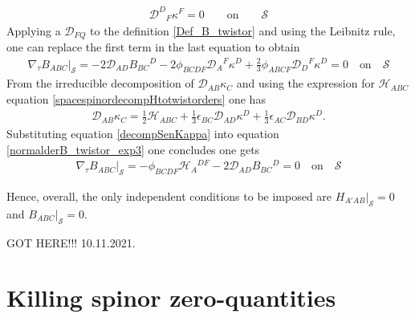 \documentclass[10pt,a4paper]{article}
\theoremstyle{plain}
\begin{document}
{\begin{align}
\mathcal{D} ^{D}{}_{F}\kappa ^{F} = 0 \qquad \text{on} \qquad
\mathcal{S}
\end{align}
Applying a $\mathcal{D}_{FQ}$ to the definition \eqref{Def_B_twistor}
and using the Leibnitz rule, one can replace the first term in the
last equation to obtain
\begin{align}\label{normalderB_twistor_exp3}
\nabla_{\tau}B_{ABC}|_{\mathcal{S}}= -2 \mathcal{D} _{AD}B_{BC}{}^{D} -2 \phi _{BCDF} \mathcal{D}
_{A}{}^{F}\kappa ^{D} +\tfrac{2}{3} \phi _{ABCF} \mathcal{D} _{D}{}^{F}\kappa ^{D}
= 0 \quad \text{on} \quad \mathcal{S}
\end{align}
From the irreducible decomposition of $\mathcal{D} _{AB}\kappa _{C}$
and using the expression for $\mathcal{H}_{ABC}$ equation
\eqref{spacespinordecompHtotwistorders} one has
\begin{align}\label{decompSenKappa}
\mathcal{D} _{AB}\kappa _{C} = \tfrac{1}{2} \mathcal{H} _{ABC} + \tfrac{1}{3} \epsilon _{BC} \mathcal{D} _{AD}\kappa ^{D} + \tfrac{1}{3} \epsilon _{AC} \mathcal{D} _{BD}\kappa ^{D}.
\end{align}
Substituting equation \eqref{decompSenKappa}
into equation \eqref{normalderB_twistor_exp3} one concludes one gets
\begin{align}
\nabla_{\tau}B_{ABC}|_{\mathcal{S}}=- \phi _{BCDF} \mathcal{H} _{A}{}^{DF} -2 \mathcal{D} _{AD}B_{BC}{}^{D} = 0 \quad \text{on} \quad \mathcal{S}
\end{align}

\noindent Hence, overall, the only independent conditions to be imposed
are $H_{A'AB}|_{\mathcal{S}}=0$ and $B_{ABC}|_{\mathcal{S}}=0$.











  
}

\medskip

GOT HERE!!! 10.11.2021.

  


\section{Killing spinor zero-quantities}
\label{Sec:KillinSpinorZeroQuantities}
\end{document}
